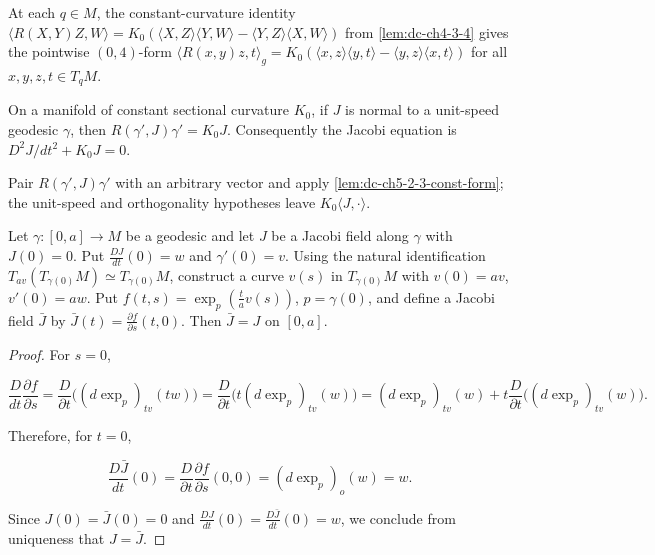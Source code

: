\begin{lemma}
  \label{lem:dc-ch5-2-3-const-form}
  \leanok
  At each $q\in M$, the constant-curvature identity
  $\langle R(X,Y)Z,W\rangle=K_0(\langle X,Z\rangle\langle Y,W\rangle-\langle Y,Z\rangle\langle X,W\rangle)$
  from \cref{lem:dc-ch4-3-4} gives the pointwise $(0,4)$-form
  $\langle R(x,y)z,t\rangle_g=K_0(\langle x,z\rangle\langle y,t\rangle-\langle y,z\rangle\langle x,t\rangle)$
  for all $x,y,z,t\in T_qM$.
\end{lemma}

\begin{lemma}[constant curvature: $R(\gamma',J)\gamma'=K J$, coordinate form]
  \label{lem:dc-ch5-2-3-jacobi-op}
  \leanok
  On a manifold of constant sectional curvature $K_0$, if $J$ is normal to a
  unit-speed geodesic $\gamma$, then
  $R(\gamma',J)\gamma'=K_0J$. Consequently the Jacobi equation is
  $D^2J/dt^2+K_0J=0$.

  \sketch
  Pair $R(\gamma',J)\gamma'$ with an arbitrary vector and apply
  \cref{lem:dc-ch5-2-3-const-form}; the unit-speed and orthogonality hypotheses
  leave $K_0\langle J,\cdot\rangle$.
\end{lemma}

\begin{proposition}
  \label{prop:dc-ch5-2-4}
  \leanok
  Let $\gamma:[0,a]\to M$ be a geodesic and let $J$ be a Jacobi field along
  $\gamma$ with $J(0)=0$. Put $\frac{DJ}{dt}(0)=w$ and $\gamma'(0)=v$. Using the
  natural identification $T_{av}(T_{\gamma(0)}M)\simeq T_{\gamma(0)}M$, construct a
  curve $v(s)$ in $T_{\gamma(0)}M$ with $v(0)=av$, $v'(0)=aw$. Put
  $f(t,s)=\exp_p(\frac{t}{a}v(s))$,
  $p=\gamma(0)$, and define a Jacobi field $\bar J$ by
  $\bar J(t)=\frac{\partial f}{\partial s}(t,0)$. Then $\bar J=J$ on $[0,a]$.
\end{proposition}
\begin{proof}
  \leanok
  \sketch
  For $s=0$,
  
  $$
  \frac{D}{dt}\frac{\partial f}{\partial s}=\frac{D}{\partial t}\big((d\exp_p)_{tv}(tw)\big)
  =\frac{D}{\partial t}\big(t(d\exp_p)_{tv}(w)\big)
  =(d\exp_p)_{tv}(w)+t\frac{D}{\partial t}\big((d\exp_p)_{tv}(w)\big).
  $$
  
  Therefore, for $t=0$,
  
  $$
  \frac{D\bar J}{dt}(0)=\frac{D}{\partial t}\frac{\partial f}{\partial s}(0,0)=(d\exp_p)_o(w)=w.
  $$
  
  Since $J(0)=\bar J(0)=0$ and $\frac{DJ}{dt}(0)=\frac{D\bar J}{dt}(0)=w$, we
  conclude from uniqueness that $J=\bar J$.
\end{proof}

